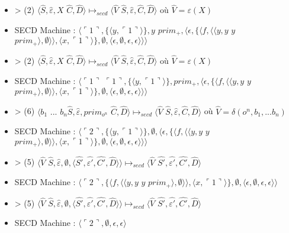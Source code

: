 \documentclass[10pt,a4paper]{article}
\begin{document}
\begin{itemize}
					\item[] > (2) $\langle\widehat{S},\widehat{\varepsilon},X$ $\widehat{C},\widehat{D}\rangle \longmapsto_{secd} \langle \widehat{V}$ $\widehat{S},\widehat{\varepsilon},\widehat{C},\widehat{D}\rangle$ où $\widehat{V} = \varepsilon(X)$
					\item[] SECD Machine : $\langle\ulcorner 1\urcorner,\{\langle y,\ulcorner 1\urcorner\rangle\},y$ $prim_{+},\langle\epsilon,\{\langle f,\langle\langle y,y$ $y$ $prim_{+}\rangle,\emptyset\rangle\rangle,\langle x,\ulcorner 1\urcorner\rangle\} ,\emptyset,\langle\epsilon,\emptyset,\epsilon,\epsilon\rangle\rangle\rangle$
					\item[] > (2) $\langle\widehat{S},\widehat{\varepsilon},X$ $\widehat{C},\widehat{D}\rangle \longmapsto_{secd} \langle \widehat{V}$ $\widehat{S},\widehat{\varepsilon},\widehat{C},\widehat{D}\rangle$ où $\widehat{V} = \varepsilon(X)$
					\item[] SECD Machine : $\langle\ulcorner 1\urcorner$ $\ulcorner 1\urcorner,\{\langle y,\ulcorner 1\urcorner\rangle\},prim_{+},\langle\epsilon,\{\langle f,\langle\langle y,y$ $y$ $prim_{+}\rangle,\emptyset\rangle\rangle,\langle x,\ulcorner 1\urcorner\rangle\} ,\emptyset,\langle\epsilon,\emptyset,\epsilon,\epsilon\rangle\rangle\rangle$
					\item[] > (6) $\langle b_{1}$ $...$ $b_{n}\widehat{S},\widehat{\varepsilon},prim_{o^{n}}$ $\widehat{C},\widehat{D}\rangle \longmapsto_{secd} \langle \widehat{V}$ $\widehat{S},\widehat{\varepsilon},\widehat{C},\widehat{D}\rangle$ où $\widehat{V} = \delta(o^{n},b_1,...b_{n})$
					\item[] SECD Machine : $\langle\ulcorner 2\urcorner,\{\langle y,\ulcorner 1\urcorner\rangle\},\emptyset,\langle\epsilon,\{\langle f,\langle\langle y,y$ $y$ $prim_{+}\rangle,\emptyset\rangle\rangle,\langle x,\ulcorner 1\urcorner\rangle\} ,\emptyset,\langle\epsilon,\emptyset,\epsilon,\epsilon\rangle\rangle\rangle$
					\item[] > (5) $\langle\widehat{V}$ $\widehat{S},\widehat{\varepsilon},\emptyset,\langle\widehat{S'},\widehat{\varepsilon'},\widehat{C'},\widehat{D}\rangle\rangle \longmapsto_{secd} \langle \widehat{V}$ $\widehat{S'},\widehat{\varepsilon'},\widehat{C'},\widehat{D}\rangle$
					\item[] SECD Machine : $\langle\ulcorner 2\urcorner,\{\langle f,\langle\langle y,y$ $y$ $prim_{+}\rangle,\emptyset\rangle\rangle,\langle x,\ulcorner 1\urcorner\rangle\} ,\emptyset,\langle\epsilon,\emptyset,\epsilon,\epsilon\rangle\rangle$
					\item[] > (5) $\langle\widehat{V}$ $\widehat{S},\widehat{\varepsilon},\emptyset,\langle\widehat{S'},\widehat{\varepsilon'},\widehat{C'},\widehat{D}\rangle\rangle \longmapsto_{secd} \langle \widehat{V}$ $\widehat{S'},\widehat{\varepsilon'},\widehat{C'},\widehat{D}\rangle$
					\item[] SECD Machine : $\langle\ulcorner 2\urcorner,\emptyset,\epsilon,\epsilon\rangle$
				\end{itemize}
				\newpage
		
\end{document}
